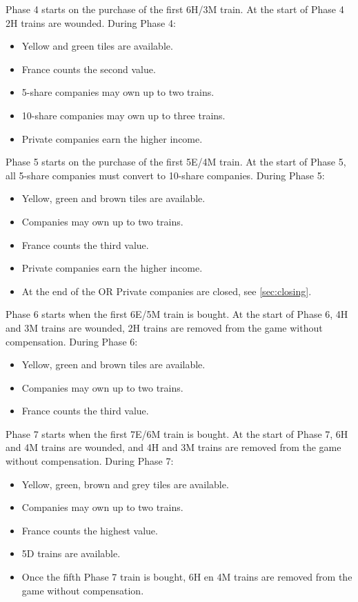 \documentclass[a4paper,twocolumn]{article}
\begin{document}
Phase 4 starts on the purchase of the first 6H/3M train. At the start of Phase 4
2H trains are wounded. During Phase 4:
\begin{itemize}
	\item Yellow and green tiles are available.
	\item France counts the second value.
	\item 5-share companies may own up to two trains.
	\item 10-share companies may own up to three trains.
	\item Private companies earn the higher income.
\end{itemize}

Phase 5 starts on the purchase of the first 5E/4M train. At the start of Phase
5, all 5-share companies must convert to 10-share companies. During Phase 5:
\begin{itemize}
	\item Yellow, green and brown tiles are available.
	\item Companies may own up to two trains.
	\item France counts the third value.
	\item Private companies earn the higher income.
	\item At the end of the OR Private companies are closed, see
	\autoref{sec:closing}.
\end{itemize}

Phase 6 starts when the first 6E/5M train is bought. At the start of Phase 6, 4H
and 3M trains are wounded, 2H trains are removed from the game without
compensation. During Phase 6:
\begin{itemize}
	\item Yellow, green and brown tiles are available.
	\item Companies may own up to two trains.
	\item France counts the third value.
\end{itemize}

Phase 7 starts when the first 7E/6M train is bought. At the start of Phase 7, 6H
and 4M trains are wounded, and 4H and 3M trains are removed from the game
without compensation. During Phase 7:
\begin{itemize}
	\item Yellow, green, brown and grey tiles are available.
	\item Companies may own up to two trains.
	\item France counts the highest value.
	\item 5D trains are available.
	\item Once the fifth Phase 7 train is bought, 6H en 4M trains are removed
	from the game without compensation.
\end{itemize}
\end{document}
